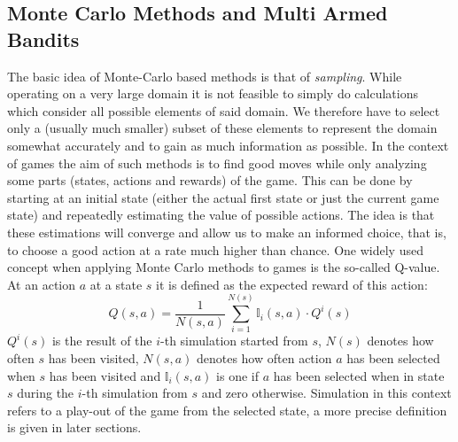 \subsection{Monte Carlo Methods and Multi Armed Bandits}
The basic idea of Monte-Carlo based methods is that of \textit{sampling}. While operating on a very large domain it is not feasible to simply do calculations which consider all possible elements of said domain. We therefore have to select only a (usually much smaller) subset of these elements to represent the domain somewhat accurately and to gain as much information as possible. In the context of games the aim of such methods is to find good moves while only analyzing some parts (states, actions and rewards) of the game. This can be done by starting at an initial state (either the actual first state or just the current game state) and repeatedly estimating the value of possible actions. The idea is that these estimations will converge and allow us to make an informed choice, that is, to choose a good action at a rate much higher than chance. One widely used concept when applying Monte Carlo methods to games is the so-called Q-value. At an action $a$ at a state $s$ it is defined as the expected reward of this action:
\begin{equation*}
    Q(s,a)= \frac{1}{N(s,a)} \sum_{i=1}^{N(s)} \mathbb{I}_i(s,a) \cdot Q^i(s)
\end{equation*}
$Q^i(s)$ is the result of the $i$-th simulation started from $s$, $N(s)$ denotes how often $s$ has been visited, $N(s,a)$ denotes how often action $a$ has been selected when $s$ has been visited and $\mathbb{I}_i(s,a)$ is one if $a$ has been selected when in state $s$ during the $i$-th simulation from $s$ and zero otherwise. Simulation in this context refers to a play-out of the game from the selected state, a more precise definition is given in later sections.


